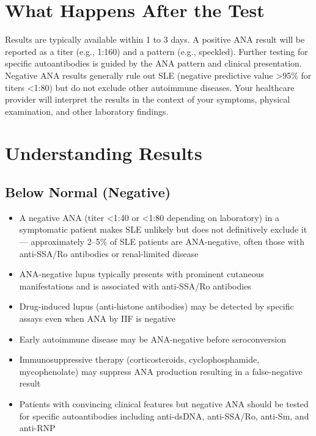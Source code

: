 \section*{What Happens After the Test}
Results are typically available within 1 to 3 days. A positive ANA result will be reported as a titer (e.g., 1:160) and a pattern (e.g., speckled). Further testing for specific autoantibodies is guided by the ANA pattern and clinical presentation. Negative ANA results generally rule out SLE (negative predictive value >95\% for titers <1:80) but do not exclude other autoimmune diseases. Your healthcare provider will interpret the results in the context of your symptoms, physical examination, and other laboratory findings.

\section*{Understanding Results}

\subsection*{Below Normal (Negative)}
\begin{itemize}
  \item A negative ANA (titer <1:40 or <1:80 depending on laboratory) in a symptomatic patient makes SLE unlikely but does not definitively exclude it --- approximately 2--5\% of SLE patients are ANA-negative, often those with anti-SSA/Ro antibodies or renal-limited disease
  \item ANA-negative lupus typically presents with prominent cutaneous manifestations and is associated with anti-SSA/Ro antibodies
  \item Drug-induced lupus (anti-histone antibodies) may be detected by specific assays even when ANA by IIF is negative
  \item Early autoimmune disease may be ANA-negative before seroconversion
  \item Immunosuppressive therapy (corticosteroids, cyclophosphamide, mycophenolate) may suppress ANA production resulting in a false-negative result
  \item Patients with convincing clinical features but negative ANA should be tested for specific autoantibodies including anti-dsDNA, anti-SSA/Ro, anti-Sm, and anti-RNP
\end{itemize}

